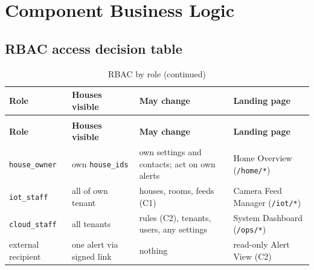 
\section{Component Business Logic}

\subsection{RBAC access decision table}
\begin{longtable}{L{3.0cm}L{3.4cm}L{4.2cm}L{4.0cm}}
\caption{RBAC by role}\label{tab:c4-dt-rbac}\\
\toprule
\textbf{Role} & \textbf{Houses visible} & \textbf{May change} & \textbf{Landing page} \\
\midrule
\endfirsthead
\caption[]{RBAC by role (continued)}\\
\toprule
\textbf{Role} & \textbf{Houses visible} & \textbf{May change} & \textbf{Landing page} \\
\midrule
\endhead
\texttt{house\_owner} & own \texttt{house\_ids} & own settings and contacts; act on own alerts & Home Overview (\texttt{/home/*}) \\
\texttt{iot\_staff} & all of own tenant & houses, rooms, feeds (C1) & Camera Feed Manager (\texttt{/iot/*}) \\
\texttt{cloud\_staff} & all tenants & rules (C2), tenants, users, any settings & System Dashboard (\texttt{/ops/*}) \\
external recipient & one alert via signed link & nothing & read-only Alert View (C2) \\
\bottomrule
\end{longtable}

